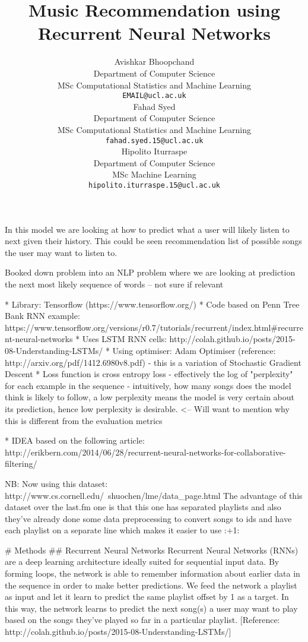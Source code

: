\documentclass{article} %
\title{Music Recommendation using Recurrent Neural Networks}
\author{
Avishkar Bhoopchand\\
Department of Computer Science\\
MSc Computational Statistics and Machine Learning\\
\texttt{EMAIL@ucl.ac.uk} \\
\And
Fahad Syed\\
Department of Computer Science\\
MSc Computational Statistics and Machine Learning\\
\texttt{fahad.syed.15@ucl.ac.uk} \\
\And
Hipolito Iturraspe\\
Department of Computer Science\\
MSc Machine Learning\\
\texttt{hipolito.iturraspe.15@ucl.ac.uk} \\
}
\begin{document}
\maketitle
\clearpage

In this model we are looking at how to predict what a user will likely listen to next given their history. This could be seen recommendation list of possible songs the user may want to listen to.

Booked down problem into an NLP problem where we are looking at prediction the next most likely sequence of words – not sure if relevant 


* Library: Tensorflow (https://www.tensorflow.org/)
* Code based on Penn Tree Bank RNN example: https://www.tensorflow.org/versions/r0.7/tutorials/recurrent/index.html#recurrent-neural-networks
* Uses LSTM RNN cells: http://colah.github.io/posts/2015-08-Understanding-LSTMs/
* Using optimiser: Adam Optimiser (reference: http://arxiv.org/pdf/1412.6980v8.pdf) - this is a variation of Stochastic Gradient Descent
* Loss function is cross entropy loss - effectively the log of "perplexity" for each example in the sequence - intuitively, how many songs does the model think is likely to follow, a low perplexity means the model is very certain about its prediction, hence low perplexity is desirable. <-- Will want to mention why this is different from the evaluation metrics

* IDEA based on the following article:
http://erikbern.com/2014/06/28/recurrent-neural-networks-for-collaborative-filtering/ 


NB: Now using this dataset: http://www.cs.cornell.edu/~shuochen/lme/data_page.html
The advantage of this dataset over the last.fm one is that this one has separated playlists and also they've already done some data preprocessing to convert songs to ids and have each playlist on a separate line which makes it easier to use :+1: 

# Methods
## Recurrent Neural Networks
Recurrent Neural Networks (RNNs) are a deep learning architecture ideally suited for sequential input data. By forming loops, the network is able to remember information about earlier data in the sequence in order to make better predictions. We feed the network a playlist as input and let it learn to predict the same playlist offset by 1 as a target. In this way, the network learns to predict the next song(s) a user may want to play based on the songs they've played so far in a particular playlist. [Reference: http://colah.github.io/posts/2015-08-Understanding-LSTMs/]
\end{document}
